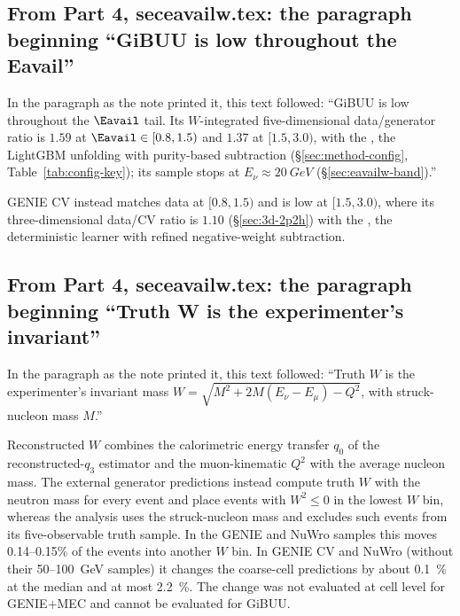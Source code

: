 \subsection{From Part 4, seceavailw.tex: the paragraph beginning ``GiBUU is low throughout the Eavail''}
In the paragraph as the note printed it, this text followed: ``GiBUU is low throughout the $\Eavail$ tail. Its $W$-integrated five-dimensional data/generator ratio is $1.59$ at $\Eavail\in[0.8,1.5)$ and $1.37$ at $[1.5,3.0)$, with the \estPurity{}, the LightGBM unfolding with purity-based subtraction (\S\ref{sec:method-config}, Table~\ref{tab:config-key}); its sample stops at $E_\nu\approx\SI{20}{GeV}$ (\S\ref{sec:eavailw-band}).''\par
GENIE CV instead matches data at $[0.8,1.5)$ and is low at $[1.5,3.0)$, where its three-dimensional data/CV ratio is $1.10$ (\S\ref{sec:3d-2p2h}) with the \estMultiD{}, the deterministic learner with refined negative-weight subtraction.

\subsection{From Part 4, seceavailw.tex: the paragraph beginning ``Truth W is the experimenter's invariant''}
In the paragraph as the note printed it, this text followed: ``Truth $W$ is the experimenter's invariant mass $W=\sqrt{M^{2}+2M(E_\nu-E_\mu)-Q^{2}}$, with struck-nucleon mass $M$.''\par
Reconstructed $W$ combines the calorimetric energy transfer $q_{0}$ of the reconstructed-$q_{3}$ estimator and the muon-kinematic $Q^{2}$ with the average nucleon mass. The external generator predictions instead compute truth $W$ with the neutron mass for every event and place events with $W^{2}\le0$ in the lowest $W$ bin, whereas the analysis uses the struck-nucleon mass and excludes such events from its five-observable truth sample. In the GENIE and NuWro samples this moves 0.14--0.15\% of the events into another $W$ bin. In GENIE CV and NuWro (without their 50--\SI{100}{GeV} samples) it changes the coarse-cell predictions by about \SI{0.1}{\percent} at the median and at most \SI{2.2}{\percent}. The change was not evaluated at cell level for GENIE$+$MEC and cannot be evaluated for GiBUU.

